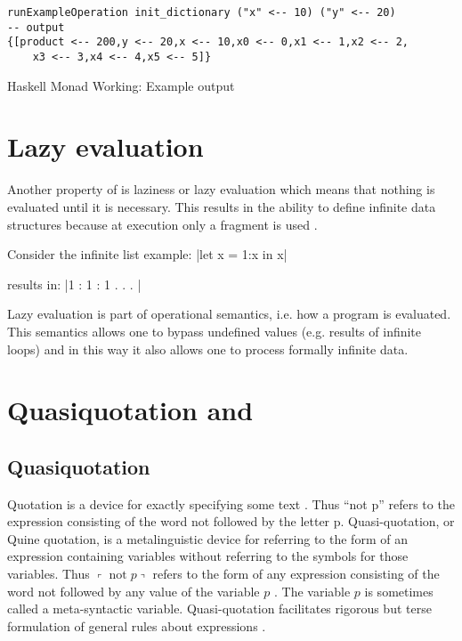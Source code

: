\documentclass[thesis-solanki.tex]{subfiles}
\begin{document}
\begin{code-list}[H]
  \begin{singlespace}
\begin{verbatim}
runExampleOperation init_dictionary ("x" <-- 10) ("y" <-- 20)
-- output
{[product <-- 200,y <-- 20,x <-- 10,x0 <-- 0,x1 <-- 1,x2 <-- 2,
    x3 <-- 3,x4 <-- 4,x5 <-- 5]}
\end{verbatim}
  \end{singlespace}
  \caption{Haskell Monad Working: Example output}
\label{tab:hskllmndworkngexamplesoutput}
\end{code-list}


\section{Lazy evaluation}
Another property of  is laziness or lazy evaluation which means that nothing is evaluated until
it is necessary.
This results in the ability to define infinite data structures because at execution only a fragment is used
\cite{website:haskelllazinesswiki}.

Consider the infinite list example:
|let x = 1:x in x|

results in:
|1 : 1 : 1 . . . |

Lazy evaluation is part of operational semantics, i.e.
how a  program is evaluated.
This semantics allows one to bypass undefined values (e.g.
results of infinite loops) and in this way it also allows one to process formally infinite data.

\section{Quasiquotation and }\label{hwh:quasiquotationandhaskell}
\subsection{Quasiquotation}

Quotation is a device for exactly specifying some text \cite{website:quotationstanford}.
Thus ``not p'' refers to the expression consisting of the word not followed by the letter p.
Quasi-quotation, or Quine quotation, is a metalinguistic device for referring to the form of an expression
containing variables without referring to the symbols for those variables.
Thus $\left\ulcorner \mathop\text{not} p \right\urcorner$ refers to the form of any expression consisting of the
word not followed by any value of the variable $p$ \cite{website:quasiquotationfreedictionary}.
The variable $p$ is sometimes called a meta-syntactic variable.
Quasi-quotation facilitates rigorous but terse formulation of general rules about expressions \cite{wikiquasi}.
\end{document}
